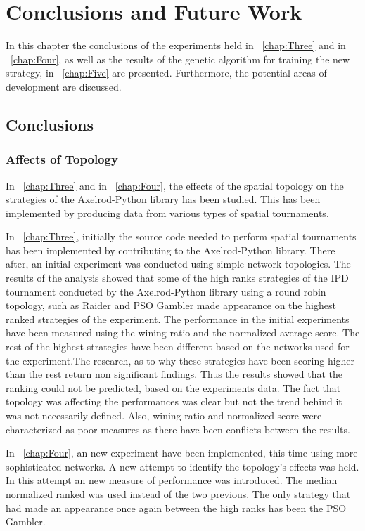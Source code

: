 \chapter{Conclusions and Future Work}
\label{chap:Six}

In this chapter the conclusions of the experiments held in
~\autoref{chap:Three} and in ~\autoref{chap:Four}, as well as the results
of the genetic algorithm for training the new strategy, in ~\autoref{chap:Five}
are presented. Furthermore, the potential areas of development are discussed.

\section{Conclusions}
\subsection{Affects of Topology}

In ~\autoref{chap:Three} and in ~\autoref{chap:Four}, the effects of the spatial
topology on the strategies of the Axelrod-Python library has been studied. This
has been implemented by producing data from various types of spatial tournaments.

In ~\autoref{chap:Three}, initially the source code needed to perform spatial tournaments
has been implemented by contributing to the Axelrod-Python library. There after,
an initial experiment was conducted using simple network topologies.
The results of the analysis showed that some of the high ranks strategies
of the IPD tournament conducted by the Axelrod-Python library using a round robin
topology, such as Raider and PSO Gambler made appearance on the highest ranked
strategies of the experiment. The performance in the initial experiments have been
measured using the wining ratio and the normalized average score. The rest of
the highest strategies have been different based on the networks used for the
experiment.The research, as to why these strategies have been scoring higher than
the rest return non significant findings. Thus the results showed that the ranking
could not be predicted, based on the experiments data. The fact that topology
was affecting the performances was clear but not the trend behind it was not necessarily
defined. Also, wining ratio and normalized score were characterized as poor measures
as there have been conflicts between the results.

In ~\autoref{chap:Four}, an new experiment have been implemented, this time using
more sophisticated networks. A new attempt to identify the topology's effects
was held. In this attempt an new measure of performance was introduced. The median
normalized ranked was used instead of the two previous. The only strategy that had
made an appearance once again between the high ranks has been the PSO Gambler.
 


